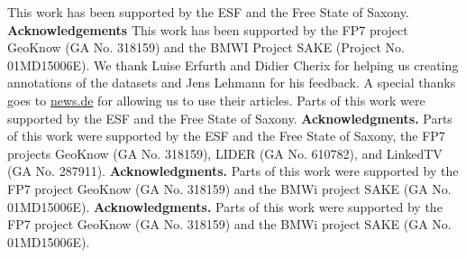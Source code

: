 This work has been supported by the ESF and the Free State of Saxony.
\textbf{Acknowledgements} This work has been supported by the FP7 project GeoKnow (GA No. 318159) and the BMWI Project SAKE (Project No. 01MD15006E).
We thank Luise Erfurth and Didier Cherix for helping us creating annotations of the datasets and Jens Lehmann for his feedback. A special thanks goes to \url{news.de} for allowing us to use their articles. Parts of this work were supported by the ESF and the Free State of Saxony.
\textbf{Acknowledgments.} Parts of this work were supported by the ESF and the Free State of Saxony, the FP7 projects GeoKnow (GA No. 318159), LIDER (GA No. 610782), and LinkedTV (GA No. 287911).
\textbf{Acknowledgments.} Parts of this work were supported by the FP7 project GeoKnow (GA No. 318159) and the BMWi project SAKE (GA No. 01MD15006E). 
\textbf{Acknowledgments.} Parts of this work were supported by the FP7 project GeoKnow (GA No. 318159) and the BMWi project SAKE (GA No. 01MD15006E). 

\endgroup




